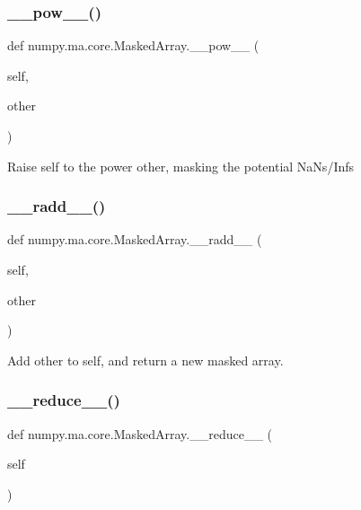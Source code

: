\subsubsection{\texorpdfstring{\+\_\+\+\_\+pow\+\_\+\+\_\+()}{\_\_pow\_\_()}}
{\footnotesize\ttfamily def numpy.\+ma.\+core.\+Masked\+Array.\+\_\+\+\_\+pow\+\_\+\+\_\+ (\begin{DoxyParamCaption}\item[{}]{self,  }\item[{}]{other }\end{DoxyParamCaption})}

\begin{DoxyVerb}Raise self to the power other, masking the potential NaNs/Infs\end{DoxyVerb}
 \mbox{\label{classnumpy_1_1ma_1_1core_1_1MaskedArray_a3919b9154502c32836e460ae0bea0e46}} 
\subsubsection{\texorpdfstring{\+\_\+\+\_\+radd\+\_\+\+\_\+()}{\_\_radd\_\_()}}
{\footnotesize\ttfamily def numpy.\+ma.\+core.\+Masked\+Array.\+\_\+\+\_\+radd\+\_\+\+\_\+ (\begin{DoxyParamCaption}\item[{}]{self,  }\item[{}]{other }\end{DoxyParamCaption})}

\begin{DoxyVerb}Add other to self, and return a new masked array.\end{DoxyVerb}
 \mbox{\label{classnumpy_1_1ma_1_1core_1_1MaskedArray_adfd70eed8a990371b0312d44e54f8f44}} 
\subsubsection{\texorpdfstring{\+\_\+\+\_\+reduce\+\_\+\+\_\+()}{\_\_reduce\_\_()}}
{\footnotesize\ttfamily def numpy.\+ma.\+core.\+Masked\+Array.\+\_\+\+\_\+reduce\+\_\+\+\_\+ (\begin{DoxyParamCaption}\item[{}]{self }\end{DoxyParamCaption})}

